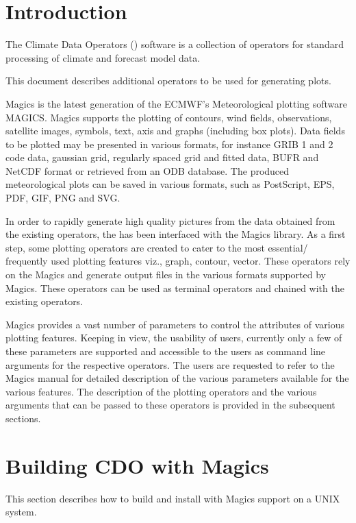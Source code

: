 \chapter{Introduction}

The Climate Data Operators ({\CDO}) software is a collection of operators
for standard processing of climate and forecast model data.

This document describes additional {\CDO} operators to be used for generating plots.

Magics is the latest generation of the ECMWF's Meteorological plotting software MAGICS.
Magics supports the plotting of contours, wind fields, observations, satellite images, symbols, text,
axis and graphs (including box plots). Data fields to be plotted may be presented in various formats, for
instance GRIB 1 and 2 code data, gaussian grid, regularly spaced grid and fitted data, BUFR and
NetCDF format or retrieved from an ODB database. The produced meteorological plots can be saved in
various formats, such as PostScript, EPS, PDF, GIF, PNG and SVG. \cite{Magics}

In order to rapidly generate high quality pictures from the data obtained from the existing {\CDO}
operators, the {\CDO} has been interfaced with the Magics library. As a first step, some {\CDO} plotting
operators are created to cater to the most essential/ frequently used plotting features viz., graph,
contour, vector. These operators rely on the Magics and generate output files in the various formats
supported by Magics. These operators can be used as terminal operators and chained with the existing 
operators.

Magics provides a vast number of parameters to control the attributes of various plotting
features. Keeping in view, the usability of {\CDO} users, currently only a few of these parameters are
supported and accessible to the {\CDO} users as command line arguments for the respective operators.
The users are requested to refer to the Magics manual \cite{Magics} for detailed description of the various
parameters available for the various features. The description of the plotting operators and the
various arguments that can be passed to these operators is provided in the subsequent sections.

\chapter{Building CDO with Magics}

This section describes how to build and install {\CDO} with Magics
support on a UNIX system.


